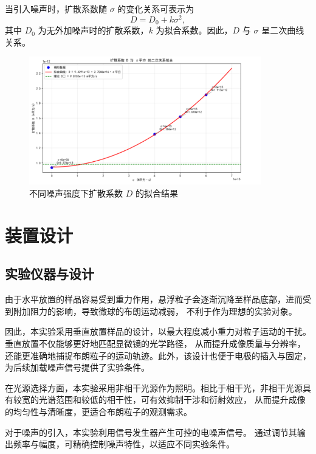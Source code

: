\documentclass[a4paper]{report} %
\begin{document}
当引入噪声时，扩散系数随 $\sigma$ 的变化关系可表示为
\begin{equation}
  D = D_0 + k\sigma^2,
  \label{eq:D_sigma}
\end{equation}
其中 $D_0$ 为无外加噪声时的扩散系数，$k$ 为拟合系数。因此，$D$ 与 $\sigma$ 呈二次曲线关系。

\begin{figure}[htbp]
  \centering
  \includegraphics[width=0.9\textwidth]{fit.png}
  \caption{不同噪声强度下扩散系数 $D$ 的拟合结果}
  \label{fig:fit}
\end{figure}


\chapter{装置设计}
\section{实验仪器与设计}
由于水平放置的样品容易受到重力作用，悬浮粒子会逐渐沉降至样品底部，进而受到附加阻力的影响，导致微球的布朗运动减弱，
不利于作为理想的实验对象\cite{einstein1905,dhont1996brownian}。\par
因此，本实验采用垂直放置样品的设计，以最大程度减小重力对粒子运动的干扰。垂直放置不仅能够更好地匹配显微镜的光学路径，
从而提升成像质量与分辨率，还能更准确地捕捉布朗粒子的运动轨迹。此外，该设计也便于电极的插入与固定，为后续加载噪声信号提供了实验条件。\par

在光源选择方面，本实验采用非相干光源作为照明。相比于相干光，非相干光源具有较宽的光谱范围和较低的相干性，可有效抑制干涉和衍射效应，
从而提升成像的均匀性与清晰度，更适合布朗粒子的观测需求\cite{goodman,mandel1995optical}。\par

对于噪声的引入，本实验利用信号发生器产生可控的电噪声信号。
通过调节其输出频率与幅度，可精确控制噪声特性，以适应不同实验条件\cite{horowitz1989art,schreiber1999electrical}。
\end{document}
